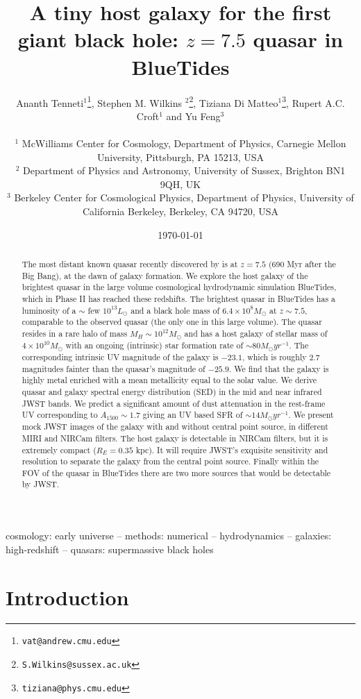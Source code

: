 \documentclass[twocolumn,useAMS,usenatbib]{mnras} \usepackage{natbib}
\title[BT-II Quasar]{A tiny host galaxy for the first giant black hole:  $z= 7.5$ quasar in BlueTides}
\author[A. Tenneti et al.]{\parbox{18cm} {Ananth
  Tenneti$^{1}$\thanks{\tt vat@andrew.cmu.edu}, Stephen M. Wilkins $^2$\thanks{\tt S.Wilkins@sussex.ac.uk},  Tiziana Di
  Matteo$^1$\thanks{\tt tiziana@phys.cmu.edu},
  Rupert A.C. Croft$^1$
  and Yu Feng$^3$ }
  \vspace{0.3cm}
  \\$^1$ McWilliams Center for
  Cosmology, Department of Physics, Carnegie Mellon University,
  Pittsburgh, PA 15213, USA\\
$^2$ Department of Physics and Astronomy, University of Sussex, Brighton BN1 9QH, UK\\
$^3$ Berkeley Center for Cosmological Physics, Department of Physics, University of California Berkeley, Berkeley, CA 94720, USA}
\date{\today}
\begin{document}
\maketitle

\begin{abstract}
The most distant known quasar recently discovered by \cite{2018Natur.553..473B} is at $z=7.5$ (690 Myr after the Big Bang), at the dawn of galaxy formation. We explore the host galaxy of the brightest quasar in the large volume cosmological hydrodynamic simulation BlueTides, which in Phase II has reached these redshifts. The brightest quasar in BlueTides has a luminosity of a $\sim$ few $10^{13} L_{\odot}$ and a black hole mass of $6.4 \times 10^{8} M_{\odot}$ at $z \sim 7.5$, comparable to the observed quasar (the only one in this large volume). The quasar resides in a rare halo of mass $M_{H} \sim 10^{12} M_{\odot}$ and has a host galaxy  of stellar mass of $4 \times 10^{10}M_{\odot}$ with an ongoing (intrinsic) star formation rate of $\sim 80 M_{\odot} yr^{-1}$. The corresponding intrinsic UV magnitude of the galaxy is $-23.1$, which is roughly $2.7$ magnitudes fainter than the quasar's magnitude of $-25.9$. We find that the galaxy is highly metal enriched with a mean metallicity equal to the solar value.
We derive quasar and galaxy spectral energy distribution (SED) in the mid and near infrared JWST bands. We predict a significant amount of dust attenuation in the rest-frame UV
corresponding to $A_{1500} \sim 1.7$ giving an UV based SFR of
$\sim 14 M_{\odot} yr^{-1}$.
We present mock JWST images of the galaxy with and without central point source, in different MIRI and NIRCam filters. The host galaxy is detectable in NIRCam filters, but it is  extremely compact ($R_{E}=0.35$ kpc). It will require 
JWST's exquisite sensitivity and resolution to separate the galaxy
from the central point source.  Finally within the FOV of the quasar in BlueTides there are two more sources that would be detectable by JWST.
\end{abstract}

\begin{keywords}
cosmology: early universe -- methods: numerical -- hydrodynamics -- galaxies: high-redshift -- quasars: supermassive black holes
\end{keywords}

\section{Introduction} \label{S:intro}
\end{document}

